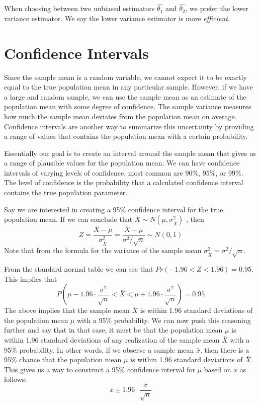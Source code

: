 \documentclass{./../../Latex/handout}
\begin{document}
When choosing between two unbiased estimators $\hat{\theta_1}$ and $\hat{\theta_2}$, we prefer the lower variance estimator. We say the lower variance estimator is more \textit{efficient}. 


\section{Confidence Intervals}

Since the sample mean is a random variable, we cannot expect it to be exactly equal to the true population mean in any particular sample. However, if we have a large and random sample, we can use the sample mean as an estimate of the population mean with some degree of confidence. The sample variance measures how much the sample mean deviates from the population mean on average. Confidence intervals are another way to summarize this uncertainty by providing a range of values that contains the population mean with a certain probability. 

Essentially our goal is to create an interval around the sample mean that gives us a
range of plausible values for the population mean. We can have confidence intervals of varying levels of confidence, most common are 90\%, 95\%, or 99\%. The level of confidence is the probability that a calculated confidence interval contains the true population parameter. 

Say we are interested in creating a 95\% confidence interval for the true population mean. If we can conclude that $\bar{X} \sim N(\mu, \sigma^2_{\bar{X}})$ , then
$$ Z = \frac{\bar{X}-\mu}{\sigma^2_{\bar{X}}} = \frac{\bar{X}-\mu}{\sigma^2/\sqrt{n}} \sim N(0,1)$$
Note that from the formula for the variance of the sample mean $\sigma^2_{\bar{X}}=\sigma^2/\sqrt{n}$. 

From the standard normal table we can see that $Pr(-1.96<Z<1.96)=0.95$. This implies that 
  $$ P\left(\mu-1.96 \cdot \frac{\sigma^2}{\sqrt{n}} < \bar{X} < \mu+1.96 \cdot \frac{\sigma^2}{\sqrt{n}} \right) = 0.95 $$
The above implies that the sample mean $\bar{X}$ is within 1.96 standard deviations of the population mean $\mu$ with a 95\% probability. We can now push this reasoning further and say that in that case, it must be that the population mean $\mu$ is within 1.96 standard deviations of any realization of the sample mean $\bar{X}$ with a 95\% probability. In other words, if we observe a sample mean $\bar{x}$, then there is a 95\% chance that the population mean $\mu$ is within 1.96 standard deviations of $\bar{X}$. This gives us a way to construct a 95\% confidence interval for $\mu$ based on $\bar{x}$ as follows:
 $$ \bar{x} \pm 1.96\cdot   \frac{\sigma}{\sqrt{n}} $$ 
 
\end{document}
